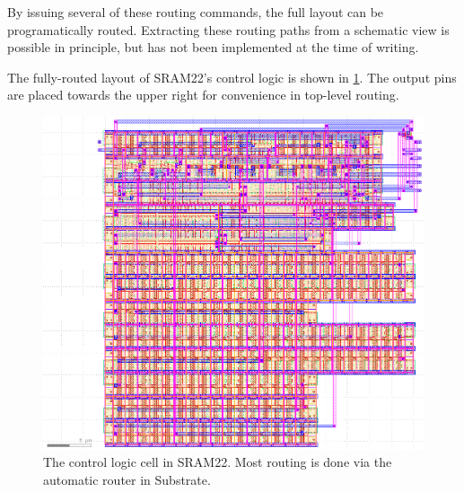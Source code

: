 By issuing several of these routing commands, the full layout can be programatically routed. Extracting these
routing paths from a schematic view is possible in principle, but has not been implemented at the time of writing.

The fully-routed layout of SRAM22's control logic is shown in \ref{fig:control-logic-routed-layout}. The output pins are placed towards
the upper right for convenience in top-level routing.

\begin{figure}[H] \centering
\includegraphics[width=\textwidth]{figures/control_logic_layout.png}
\caption{The control logic cell in SRAM22. Most routing is done via the automatic router in Substrate. \label{fig:control-logic-routed-layout}}
\end{figure}


